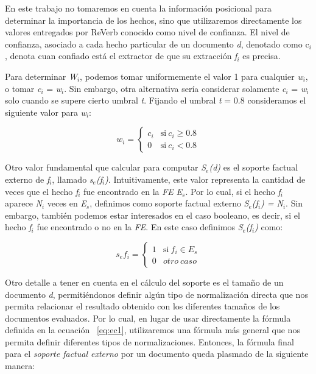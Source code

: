 En este trabajo no tomaremos en cuenta la informaci\'on posicional para determinar la importancia de los hechos, sino que utilizaremos directamente los valores entregados por ReVerb conocido como nivel de confianza.
El nivel de confianza, asociado a cada hecho particular de un documento \textit{d}, denotado como c${_i}$, denota cuan confiado est\'a el extractor de que su extracci\'on \emph{f${_i}$} es precisa.

Para determinar \emph{W${_i}$}, podemos tomar uniformemente el valor 1 para cualquier \emph{w${_i}$}, o tomar \emph{c${_i}$} = \emph{w${_i}$}. Sin embargo, otra alternativa ser\'ia considerar solamente \emph{c${_i}$} = \emph{w${_i}$} solo cuando se supere cierto umbral \emph{t}. Fijando el umbral \emph{t} =  0.8 	consideramos el siguiente valor para \emph{w${_i}$}:

\begin{equation}
 \label{eq:ec2}
     w{_i} = \left\{
	       \begin{array}{ll}
		 c{_i}      & \mathrm{si\ } c{_i} \geq 0.8 \\
		 0 & \mathrm{si\ } c{_i} < 0.8 		
	       \end{array}
	     \right.
\end{equation}

Otro valor fundamental que calcular para computar \emph{S${_e}$(d)} es el soporte factual externo de \emph{f${_i}$}, llamado \emph{s${_e}$(f${_i}$)}. Intuitivamente, este valor representa la cantidad de veces que el hecho \emph{f${_i}$} fue encontrado en la \emph{FE} \emph{E${_s}$}. Por lo cual, si el hecho \emph{f${_i}$} aparece \emph{N${_i}$} veces en \emph{E${_s}$}, definimos como soporte factual externo \emph{S${_e}$(f${_i}$) = N${_i}$}. Sin embargo, tambi\'en podemos estar interesados en el caso booleano, es decir, si el hecho \emph{f${_i}$} fue encontrado o no en la \emph{FE}. En este caso definimos \emph{S${_e}$(f${_i}$)} como:

\begin{equation}
     \label{eq:ec3}
     s{_e}f{_i} = \left\{
	       \begin{array}{ll}
		 1 & \mathrm{si\ } f{_i} \in E{_s} \\
		 0 & otro \ caso 		
	       \end{array}
	     \right.
\end{equation}

Otro detalle a tener en cuenta en el c\'alculo del soporte es el tama\~no de un documento \textit{d}, permiti\'endonos definir alg\'un tipo de normalizaci\'on directa que nos permita relacionar el resultado obtenido con los diferentes tama\~nos de los documentos evaluados. Por lo cual, en lugar de usar directamente la f\'ormula definida en la ecuaci\'on ~\ref{eq:ec1}, utilizaremos una f\'ormula m\'as general que nos permita definir diferentes tipos de normalizaciones. Entonces, la f\'ormula final para el \emph{soporte factual externo} por un documento queda plasmado de la siguiente manera:

